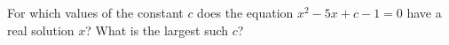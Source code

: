 For which values of the constant $c$ does the equation $x^2-5x+c-1=0$ have a real solution $x$? What is the largest such $c$?
